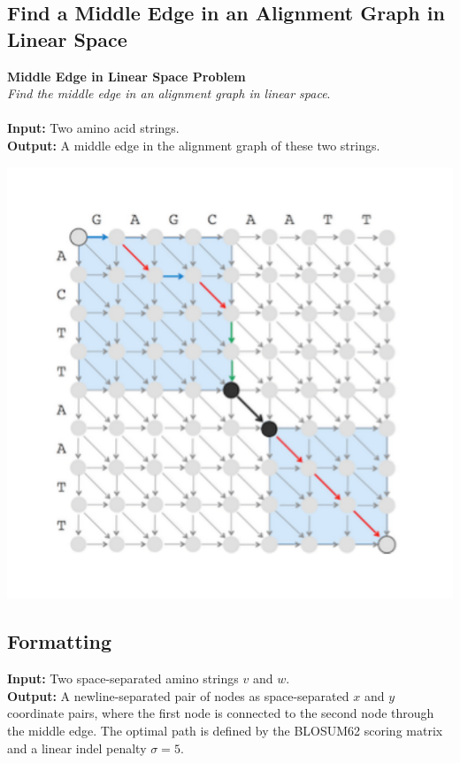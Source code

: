 \documentclass{article}
\begin{document}
\subsection{Find a Middle Edge in an Alignment Graph in Linear Space}
\hline\vspace{5}
\textbf{Middle Edge in Linear Space Problem}\\
\emph{Find the middle edge in an alignment graph in linear space}.\\ \\
\textbf{Input:} Two amino acid strings.\\
\textbf{Output:} A middle edge in the alignment graph of these two strings.
\begin{center}
    \includegraphics[scale=0.32]{c5/logos/5K.png}
\end{center}
\hline\vspace{5}

\subsection*{Formatting}
\noindent\textbf{Input:} Two space-separated amino strings $v$ and $w$.\\
\noindent\textbf{Output:} A newline-separated pair of nodes as space-separated $x$ and $y$ coordinate pairs, where the first node is connected to the second node through the middle edge. The optimal path is defined by the BLOSUM62 scoring matrix and a linear indel penalty $\sigma=5$.
\end{document}
